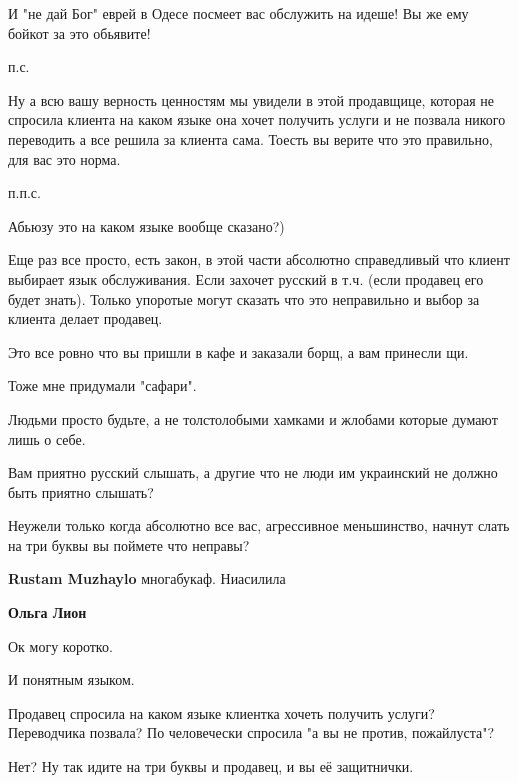 \begin{itemize}
\begin{itemize}
И "не дай Бог" еврей в Одесе посмеет вас обслужить на идеше! Вы же ему бойкот
за это обьявите!

п.с.

Ну а всю вашу верность ценностям мы увидели в этой продавщице, которая не
спросила клиента на каком языке она хочет получить услуги и не позвала никого
переводить а все решила за клиента сама. Тоесть вы верите что это правильно,
для вас это норма.

п.п.с.

Абьюзу это на каком языке вообще сказано?)

Еще раз все просто, есть закон, в этой части абсолютно справедливый что клиент
выбирает язык обслуживания. Если захочет русский в т.ч.  (если продавец его
будет знать). Только упоротые могут сказать что это неправильно и выбор за
клиента делает продавец.

Это все ровно что вы пришли в кафе и заказали борщ, а вам принесли щи.

Тоже мне придумали "сафари".

Людьми просто будьте, а не толстолобыми хамками и жлобами которые думают лишь о
себе.

Вам приятно русский слышать, а другие что не люди им украинский не должно быть
приятно слышать?

Неужели только когда абсолютно все вас, агрессивное меньшинство, начнут слать
на три буквы вы поймете что неправы?

 
\textbf{Rustam Muzhaylo} многабукаф. Ниасилила

 
\textbf{Ольга Лион}

Ок могу коротко.

И понятным языком.

Продавец спросила на каком языке клиентка хочеть получить услуги? Переводчика
позвала? По человечески спросила "а вы не против, пожайлуста"?

Нет? Ну так идите на три буквы и продавец, и вы её защитнички.


\end{itemize}
\end{itemize}
